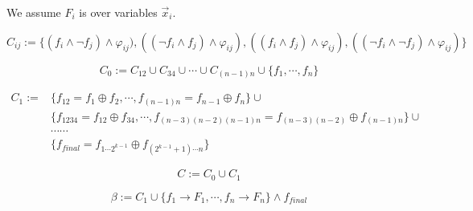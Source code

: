 \documentclass[12pt]{article}
\begin{document}
We assume $F_i$ is over variables $\vec{x}_i$. 



$$C_{ij}:=\{(f_i\wedge \neg f_j)\wedge \varphi_{ij}), 
((\neg f_i\wedge f_j)\wedge \varphi_{ij}), 
((f_i\wedge f_j)\wedge \varphi_{ij}),
((\neg f_i\wedge \neg f_j)\wedge \varphi_{ij})\}
$$

$$C_0:=C_{12}\cup C_{34}\cup\cdots\cup C_{(n-1)n}\cup \{f_1,\cdots, f_n\}$$


$$\begin{array}{ll}C_1:=&\{f_{12}=f_1\oplus f_2, \cdots, f_{(n-1)n}=f_{n-1}\oplus f_n\}\cup \\

&\{f_{1234}=f_{12}\oplus f_{34}, \cdots, f_{(n-3)(n-2)(n-1)n}=f_{(n-3)(n-2)}\oplus f_{(n-1)n}\}\cup \\

&\cdots\cdots \\

&\{f_{final}=f_{1\cdots2^{k-1}}\oplus f_{(2^{k-1}+1)\cdots n}\}
\end{array}
$$


$$C:=C_0\cup C_1$$

$$\beta:=C_1\cup \{f_1\rightarrow F_1, \cdots, f_n\rightarrow F_n\}\wedge f_{final}$$


\end{document}
